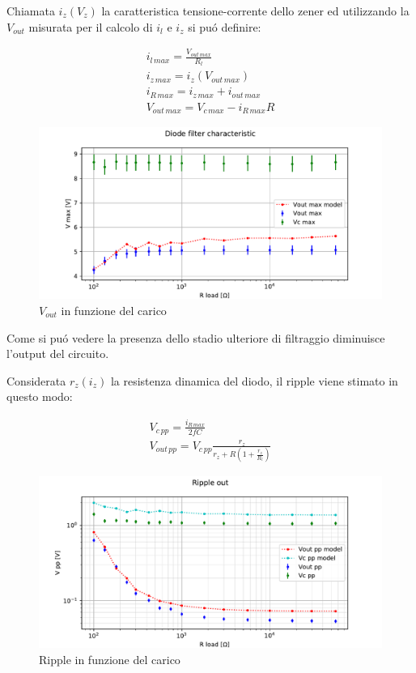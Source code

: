 Chiamata $i_z(V_z)$ la caratteristica tensione-corrente dello zener ed utilizzando la $V_{out}$ misurata per il calcolo di $i_l$ e $i_z$ si pu\'o definire:

\begin{gather}
	i_{l\, max} = \frac{V_{out\, max}}{R_l} \\
	i_{z\, max} = i_z(V_{out\, max}) \\
	i_{R\, max} = i_{z\, max} + i_{out\, max} \\
	V_{out\, max} = V_{c\, max} - i_{R\, max} R
\end{gather}

\begin{figure}[h]
\centering
\includegraphics[width=\textwidth]{fig4.pdf}
\caption{$V_{out}$ in funzione del carico}
\label{fig:vdiod}
\end{figure}

Come si pu\'o vedere la presenza dello stadio ulteriore di filtraggio diminuisce l'output del circuito.

Considerata $r_z(i_z)$ la resistenza dinamica del diodo, il ripple viene stimato in questo modo:

\begin{gather}
	V_{c\, pp} = \frac{i_{R\, max}}{2fC} \\
	V_{out\, pp} = V_{c\, pp} \frac{r_z}{r_z+R(1+\frac{r_z}{R_l})}
\end{gather}

\begin{figure}[h]
\centering
\includegraphics[width=\textwidth]{fig5.pdf}
\caption{Ripple in funzione del carico}
\label{fig:vdiodpp}
\end{figure}









